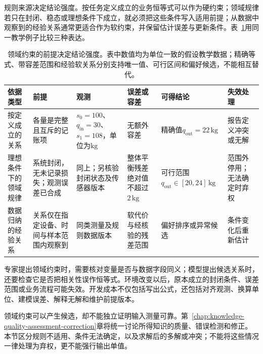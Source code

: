 规则来源决定结论强度。按任务定义成立的业务恒等式可以作为硬约束；领域规律若只在封闭、稳态或理想条件下成立，就必须把这些条件写入适用前提；从数据中观察到的经验关系通常更适合作为软约束，并保留估计误差与更新条件。表~\ref{tab:rule-based-knowledge-acquisition-domain-constraint}用同一教学例子比较三种表达。

\begin{table}[htbp]
  \centering
  \begingroup
  \setlength{\tabcolsep}{2.5pt}
  \setlength{\parindent}{0pt}
  \setlength{\RaggedRightParindent}{0pt}
  \renewcommand{\arraystretch}{1.12}
  \begin{tabularx}{\linewidth}{>{\raggedright\arraybackslash}p{23mm}>{\raggedright\arraybackslash}p{32mm}>{\raggedright\arraybackslash}p{25mm}>{\raggedright\arraybackslash}p{26mm}>{\raggedright\arraybackslash}p{32mm}>{\raggedright\arraybackslash}X}
    \toprule
    依据类型 & 前提 & 观测 & 误差或容差 & 可得结论 & 失效处理 \\
    \midrule
    按定义成立的关系 & 各量是完整且互斥的记账项 & $s_0=100$、$q_{\mathrm{in}}=30$、$s_1=108$，单位为$\mathrm{kg}$ & 无额外容差 & 精确值$q_{\mathrm{out}}=22\,\mathrm{kg}$ & 报告定义冲突或无解 \\
    理想条件下的领域规律 & 系统封闭，无未记录损失；观测误差已合成 & 同上；另核验封闭状态及传感器版本 & 整体平衡残差绝对值不超过$2\,\mathrm{kg}$ & 可行范围$q_{\mathrm{out}}\in[20,24]\,\mathrm{kg}$ & 范围外停用；无法确定时弃权 \\
    数据归纳的经验关系 & 关系仅在指定设备、时间与样本范围内观察到 & 同类测量及规则数据版本 & 软代价与经核验的残差范围 & 偏好排序或异常候选 & 条件变化后重新估计 \\
    \bottomrule
  \end{tabularx}
  \endgroup
  \caption{领域约束的前提决定结论强度。表中数值均为单位一致的假设教学数据；精确等式、带容差范围和经验软关系分别支持唯一值、可行区间和偏好候选，不能相互替代。}
  \label{tab:rule-based-knowledge-acquisition-domain-constraint}
\end{table}

专家提出领域约束时，需要核对变量是否与数据字段同义；模型提出候选关系时，还要检查它是否把相关性误作恒等式。环境改变以后，原本成立的封闭条件、误差范围或业务流程可能失效。开发成本不仅包括写出公式，还包括对齐观测、换算单位、建模误差、解释无解和维护前提版本。

领域约束可以产生候选，却不能独立证明输入测量可靠。第~\ref{chap:knowledge-quality-assessment-correction}章将统一讨论所得知识的质量、错误检测和修正。本节区分规则不适用、条件无法确定，以及求解后的多解或冲突；不能将这些情况一律处理为弃权，更不能强行输出单值。

